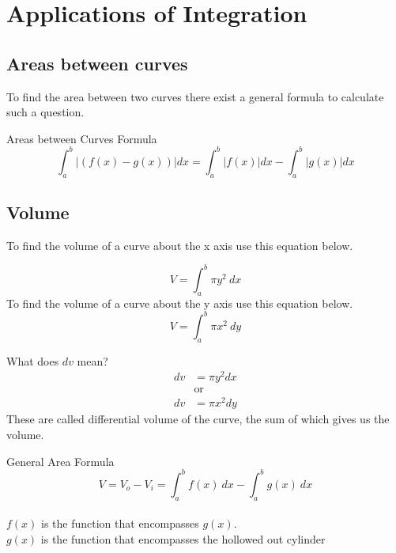 \documentclass[letterpaper,10pt,twoside,twocolumn,openany]{book}
\begin{document}
\chapter{Applications of Integration}
\section{Areas between curves}
To find the area between two curves there exist a general formula to calculate such a question.\\
\begin{DndSidebar}[]{Areas between Curves Formula}
    \begin{equation}
        \int_a^b |(f(x)-g(x))|dx = \int_a^b |f(x)| dx - \int_a^b |g(x)| dx
    \end{equation}
\end{DndSidebar}


\section{Volume}
\begin{DndSidebar}[]{}
To find the volume of a curve about the x axis use this equation below.
    
    \begin{equation}
        V = \int_a^b \pi y^2\ dx
    \end{equation}
    To find the volume of a curve about the y axis use this equation below.
    \begin{equation}
        V = \int_a^b \pi x^2\ dy
    \end{equation}
\end{DndSidebar}
\begin{DndComment}{What does $dv$ mean?}
    \begin{align*}
        dv &= \pi y^2 dx \\
        &\text{or}\\
        dv &= \pi x^2 dy
    \end{align*}
    These are called differential volume of the curve, the sum of which gives us the volume.
\end{DndComment}
\begin{DndSidebar}{General Area Formula}
    \begin{equation}
        V = V_o - V_i = \int_a^b f(x)\ dx - \int_a^b g(x)\ dx 
    \end{equation}\\
    $f(x)$ is the function that encompasses $g(x)$.
    \\
    $g(x)$ is the function that encompasses the hollowed out cylinder
\end{DndSidebar}
\end{document}
